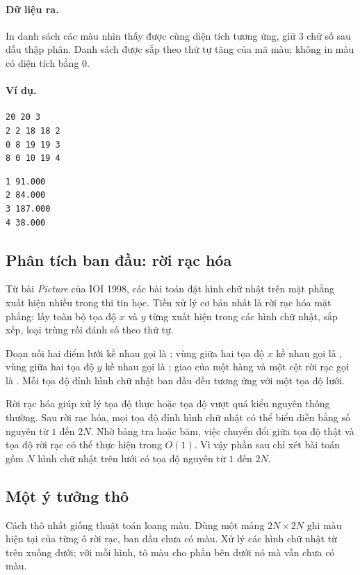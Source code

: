 \documentclass[11pt]{article}
\begin{document}
\paragraph{Dữ liệu ra.}
In danh sách các màu nhìn thấy được cùng diện tích tương ứng, giữ \(3\) chữ
số sau dấu thập phân. Danh sách được sắp theo thứ tự tăng của mã màu; không
in màu có diện tích bằng \(0\).

\paragraph{Ví dụ.}
\begin{verbatim}
20 20 3
2 2 18 18 2
0 8 19 19 3
8 0 10 19 4
\end{verbatim}

\begin{verbatim}
1 91.000
2 84.000
3 187.000
4 38.000
\end{verbatim}

\subsection{Phân tích ban đầu: rời rạc hóa}

Từ bài \textit{Picture} của IOI 1998, các bài toán đặt hình chữ nhật trên mặt
phẳng xuất hiện nhiều trong thi tin học. Tiền xử lý cơ bản nhất là rời rạc
hóa mặt phẳng: lấy toàn bộ tọa độ \(x\) và \(y\) từng xuất hiện trong các
hình chữ nhật, sắp xếp, loại trùng rồi đánh số theo thứ tự.

Đoạn nối hai điểm lưới kề nhau gọi là ; vùng giữa hai
tọa độ \(x\) kề nhau gọi là , vùng giữa hai tọa độ \(y\) kề
nhau gọi là ; giao của một hàng và một cột rời rạc gọi là
. Mỗi tọa độ đỉnh hình chữ nhật ban đầu đều tương ứng với một
tọa độ lưới.

Rời rạc hóa giúp xử lý tọa độ thực hoặc tọa độ vượt quá kiểu nguyên thông
thường. Sau rời rạc hóa, mọi tọa độ đỉnh hình chữ nhật có thể biểu diễn bằng
số nguyên từ \(1\) đến \(2N\). Nhờ bảng tra hoặc băm, việc chuyển đổi giữa
tọa độ thật và tọa độ rời rạc có thể thực hiện trong \(O(1)\). Vì vậy phần
sau chỉ xét bài toán gồm \(N\) hình chữ nhật trên lưới có tọa độ nguyên từ
\(1\) đến \(2N\).

\subsection{Một ý tưởng thô}

Cách thô nhất giống thuật toán loang màu. Dùng một mảng \(2N\times 2N\) ghi
màu hiện tại của từng ô rời rạc, ban đầu chưa có màu. Xử lý các hình chữ nhật
từ trên xuống dưới; với mỗi hình, tô màu cho phần bên dưới nó mà vẫn chưa có
màu.
\end{document}
